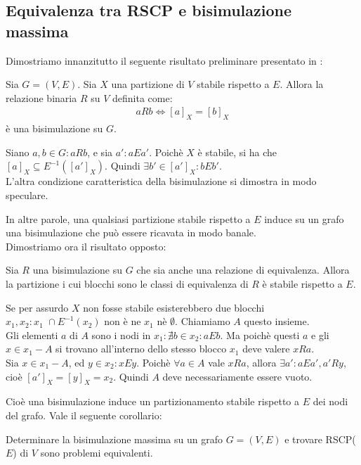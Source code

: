 \subsection{Equivalenza tra RSCP e bisimulazione massima}
Dimostriamo innanzitutto il seguente risultato preliminare presentato in \cite{gentilini}:
\begin{proposition}
    Sia $G = (V,E)$. Sia $X$ una partizione di $V$ stabile rispetto a $E$. Allora la relazione binaria $R$ su $V$ definita come:
    \begin{gather*}
        a R b \iff [a]_X = [b]_X
    \end{gather*}
    è una bisimulazione su $G$.
    \label{prop:part_induce_bisi}
\end{proposition}
\begin{proof2}
    Siano $a,b \in G : a R b$, e sia $a' : a E a'$. Poichè $X$ è stabile, si ha che $[a]_X \subseteq E^{-1}([a']_X)$. Quindi $\exists b' \in [a']_X : b E b'$.\\
    L'altra condizione caratteristica della bisimulazione si dimostra in modo speculare.
\end{proof2}
In altre parole, una qualsiasi partizione stabile rispetto a $E$ induce su un grafo una bisimulazione che può essere ricavata in modo banale.\\
Dimostriamo ora il risultato opposto:
\begin{proposition}
    Sia $R$ una bisimulazione su $G$ che sia anche una relazione di equivalenza. Allora la partizione i cui blocchi sono le classi di equivalenza di $R$ è stabile rispetto a $E$.
    \label{prop:bisi_induce_part}
\end{proposition}
\begin{proof2}
    Se per assurdo $X$ non fosse stabile esisterebbero due blocchi $x_1, x_2 : x_1 \,\,\cap E^{-1}(x_2)$ non è ne $x_1$ nè $\emptyset$. Chiamiamo $A$ questo insieme.\\
    Gli elementi $a$ di $A$ sono i nodi in $x_1 : \nexists b \in x_2 : a E b$. Ma poichè questi $a$ e gli $x \in x_1 - A$ si trovano all'interno dello stesso blocco $x_1$ deve valere $x R a$.\\
    Sia $x \in x_1 - A$, ed $y \in x_2 : x E y$. Poichè $\forall a \in A$ vale $x R a$, allora $\exists a' : a E a', a' R y$, cioè $[a']_X = [y]_X = x_2$. Quindi $A$ deve necessariamente essere vuoto.
\end{proof2}
Cioè una bisimulazione induce un partizionamento stabile rispetto a $E$ dei nodi del grafo. Vale il seguente corollario:
\begin{corollary}
    Determinare la bisimulazione massima su un grafo $G = (V,E)$ e trovare RSCP($E$) di $V$ sono problemi equivalenti.
\end{corollary}
